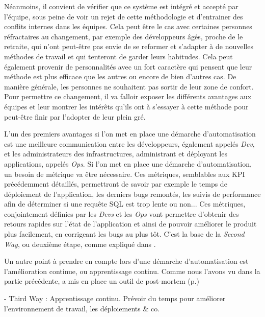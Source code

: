 Néanmoins, il convient de vérifier que ce système est intégré et accepté par l'équipe, sous peine de voir un rejet de cette méthodologie et d'entrainer des conflits internes dans les équipes. Cela peut être le cas avec certaines personnes réfractaires au changement, par exemple des développeurs âgés, proche de le retraite, qui n'ont peut-être pas envie de se reformer et s'adapter à de nouvelles méthodes de travail et qui tenteront de garder leurs habitudes. Cela peut également provenir de personnalités avec un fort caractère qui pensent que leur méthode est plus efficace que les autres ou encore de bien d'autres cas. De manière générale, les personnes ne souhaitent pas sortir de leur zone de confort. Pour permettre ce changement, il va falloir exposer les différents avantages aux équipes et leur montrer les intérêts qu'ils ont à s'essayer à cette méthode pour peut-être finir par l'adopter de leur plein gré. 

L'un des premiers avantages si l'on met en place une démarche d'automatisation est une meilleure communication entre les développeurs, également appelés \emph{Dev}, et les administrateurs des infrastructures, administrant et déployant les applications, appelés \emph{Ops}. Si l'on met en place une démarche d'automatisation, un besoin de métrique va être nécessaire. Ces métriques, semblables aux \gls{KPI} précédemment détaillés, permettront de savoir par exemple le temps de déploiement de l'application, les derniers bugs remontés, les suivis de performance afin de déterminer si une requête \gls{SQL} est trop lente ou non... Ces métriques, conjointement définies par les \emph{Devs} et les \emph{Ops} vont permettre d'obtenir des retours rapides sur l'état de l'application et ainsi de pouvoir améliorer le produit plus facilement, en corrigeant les bugs au plus tôt. C'est la base de la \emph{Second Way}, ou deuxième étape, comme expliqué dans  \cite[p.405-410]{phoenixProject}.

Un autre point à prendre en compte lors d'une démarche d'automatisation est l'amélioration continue, ou apprentissage continu. Comme nous l'avons vu dans la partie précédente, \etsy a mis en place un outil de post-mortem (p.\pageref{post-mortem})


- Third Way : Apprentissage continu. Prévoir du temps pour améliorer l'environnement de travail, les déploiements  \& co.

